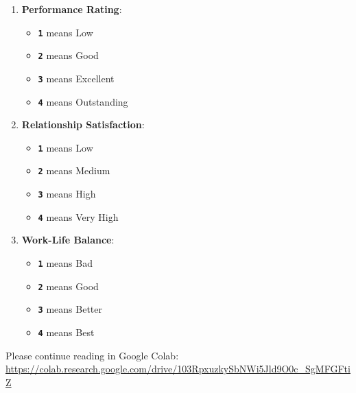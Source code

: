 \documentclass[12pt, a4paper]{article}
\begin{document}
\begin{enumerate}
                \item \textbf{Performance Rating}:
                \begin{itemize}
                    \item \textbf{\texttt{1}} means Low
                    \item \textbf{\texttt{2}} means Good
                    \item \textbf{\texttt{3}} means Excellent
                    \item \textbf{\texttt{4}} means Outstanding
                \end{itemize}

    \pagebreak

                \item \textbf{Relationship Satisfaction}:
                \begin{itemize}
                    \item \textbf{\texttt{1}} means Low
                    \item \textbf{\texttt{2}} means Medium
                    \item \textbf{\texttt{3}} means High
                    \item \textbf{\texttt{4}} means Very High
                \end{itemize}

                \item \textbf{Work-Life Balance}:
                \begin{itemize}
                    \item \textbf{\texttt{1}} means Bad
                    \item \textbf{\texttt{2}} means Good
                    \item \textbf{\texttt{3}} means Better
                    \item \textbf{\texttt{4}} means Best
                \end{itemize}
            \end{enumerate}
            
            Please continue reading in Google Colab: \url{https://colab.research.google.com/drive/103RpxuzkySbNWi5Jld9O0c_SgMFGFtiZ}
\end{document}
